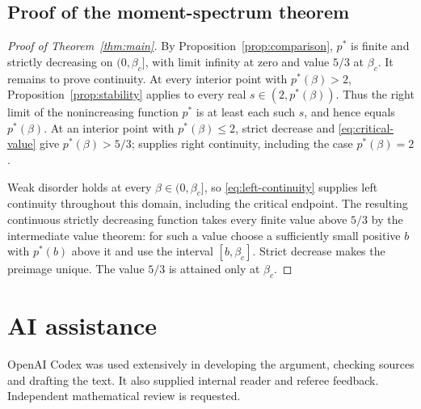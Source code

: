 \documentclass[11pt]{amsart}
\newcommand{\ps}{p^*}
\theoremstyle{remark}
\numberwithin{equation}{section}
\begin{document}
\subsection{Proof of the moment-spectrum theorem}
\begin{proof}[Proof of Theorem~\ref{thm:main}]
By Proposition~\ref{prop:comparison}, $\ps$ is finite and strictly decreasing
on $(0,\beta_c]$, with limit infinity at zero and value $5/3$ at $\beta_c$.
It remains to prove continuity. At every interior point with $\ps(\beta)>2$,
Proposition~\ref{prop:stability} applies to every real $s\in(2,\ps(\beta))$.
Thus the right limit of the nonincreasing function $\ps$ is at least each such
$s$, and hence equals $\ps(\beta)$. At an interior point with $\ps(\beta)\le2$,
strict decrease and \eqref{eq:critical-value} give $\ps(\beta)>5/3$;
\cite[Theorem~1.2(i)]{Junk} supplies right continuity, including the case
$\ps(\beta)=2$.

Weak disorder holds at every $\beta\in(0,\beta_c]$, so
\eqref{eq:left-continuity} supplies left continuity throughout this domain,
including the critical endpoint. The resulting continuous strictly decreasing
function takes every finite value above $5/3$ by the intermediate value theorem:
for such a value choose a sufficiently small positive $b$ with $\ps(b)$ above
it and use the interval $[b,\beta_c]$. Strict decrease makes the preimage unique.
The value $5/3$ is attained only at $\beta_c$.
\end{proof}

\section*{AI assistance}
OpenAI Codex was used extensively in developing the argument, checking sources
and drafting the text. It also supplied internal reader and referee feedback.
Independent mathematical review is requested.
\end{document}
